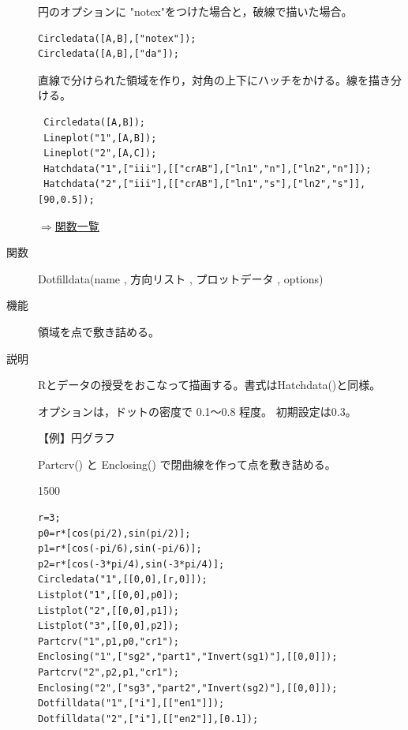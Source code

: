 \documentclass[papersize,a4paper,10pt,uplatex]{jsarticle}
\begin{document}
\begin{description}

 
円のオプションに "notex"をつけた場合と，破線で描いた場合。
\begin{verbatim}
Circledata([A,B],["notex"]);
Circledata([A,B],["da"]);
 \end{verbatim}

\hspace{10mm}  

直線で分けられた領域を作り，対角の上下にハッチをかける。線を描き分ける。
\begin{verbatim}
 Circledata([A,B]);
 Lineplot("1",[A,B]);
 Lineplot("2",[A,C]);
 Hatchdata("1",["iii"],[["crAB"],["ln1","n"],["ln2","n"]]);
 Hatchdata("2",["iii"],[["crAB"],["ln1","s"],["ln2","s"]],[90,0.5]);
\end{verbatim}

\hspace{40mm} 

\begin{flushright}\hyperlink{functionlist}{$\Rightarrow$関数一覧}\end{flushright}

\vspace{\baselineskip}
\hypertarget{dotfilldata}{}
\item[関数]Dotfilldata(name , 方向リスト , プロットデータ , options)
\item[機能]領域を点で敷き詰める。
\item[説明]Rとデータの授受をおこなって描画する。書式はHatchdata()と同様。

オプションは，ドットの密度で 0.1〜0.8 程度。 初期設定は0.3。

\vspace{\baselineskip}
【例】円グラフ

Partcrv() と Enclosing() で閉曲線を作って点を敷き詰める。


\begin{layer}{150}{0}
\end{layer}

\begin{verbatim}
r=3;
p0=r*[cos(pi/2),sin(pi/2)];
p1=r*[cos(-pi/6),sin(-pi/6)];
p2=r*[cos(-3*pi/4),sin(-3*pi/4)];
Circledata("1",[[0,0],[r,0]]);
Listplot("1",[[0,0],p0]);
Listplot("2",[[0,0],p1]);
Listplot("3",[[0,0],p2]);
Partcrv("1",p1,p0,"cr1");
Enclosing("1",["sg2","part1","Invert(sg1)"],[[0,0]]);
Partcrv("2",p2,p1,"cr1");
Enclosing("2",["sg3","part2","Invert(sg2)"],[[0,0]]);
Dotfilldata("1",["i"],[["en1"]]);
Dotfilldata("2",["i"],[["en2"]],[0.1]);
\end{verbatim}


\end{description}
\end{document}
